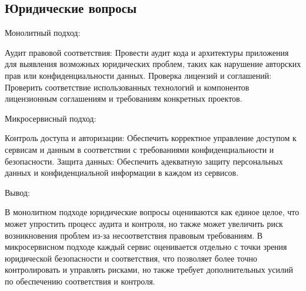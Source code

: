 \subsection{Юридические вопросы}

Монолитный подход:

    Аудит правовой соответствия: Провести аудит кода и архитектуры приложения для выявления возможных юридических проблем, таких как нарушение авторских прав или конфиденциальности данных.
    Проверка лицензий и соглашений: Проверить соответствие использованных технологий и компонентов лицензионным соглашениям и требованиям конкретных проектов.

Микросервисный подход:

    Контроль доступа и авторизации: Обеспечить корректное управление доступом к сервисам и данным в соответствии с требованиями конфиденциальности и безопасности.
    Защита данных: Обеспечить адекватную защиту персональных данных и конфиденциальной информации в каждом из сервисов.

Вывод:

    В монолитном подходе юридические вопросы оцениваются как единое целое, что может упростить процесс аудита и контроля, но также может увеличить риск возникновения проблем из-за несоответствия правовым требованиям.
    В микросервисном подходе каждый сервис оценивается отдельно с точки зрения юридической безопасности и соответствия, что позволяет более точно контролировать и управлять рисками, но также требует дополнительных усилий по обеспечению соответствия и контроля.
    
        
\clearpage